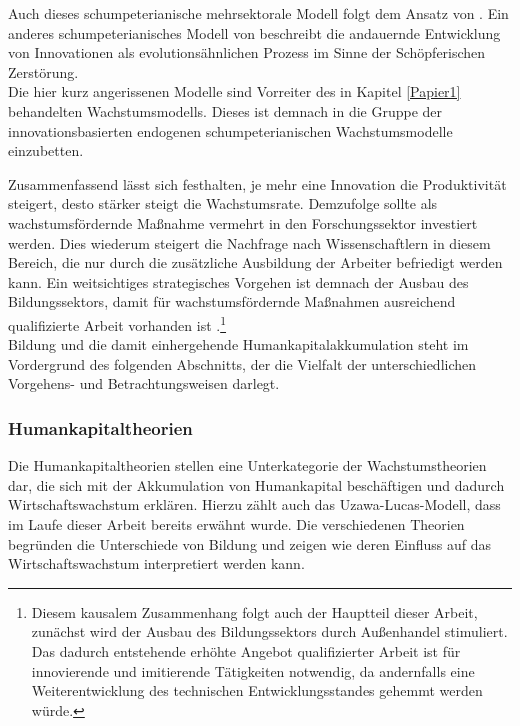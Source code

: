 Auch dieses schumpeterianische mehrsektorale Modell folgt dem Ansatz von \citet{Aghion.1998}. Ein anderes schumpeterianisches Modell von \citet{Reinganum.1985} beschreibt die andauernde Entwicklung von Innovationen als evolutions{\"a}hnlichen Prozess im Sinne der Sch{\"o}pferischen Zerst{\"o}rung.\\
Die hier kurz angerissenen Modelle sind Vorreiter des in Kapitel \ref{Papier1} behandelten Wachstumsmodells. Dieses ist demnach in die Gruppe der innovationsbasierten endogenen schumpeterianischen Wachstumsmodelle einzubetten. 


Zusammenfassend lässt sich festhalten, je mehr eine Innovation die Produktivit{\"a}t steigert, desto st{\"a}rker steigt die Wachstumsrate. Demzufolge sollte als wachstumsf{\"o}rdernde Ma{\ss}nahme vermehrt in den Forschungssektor investiert werden. Dies wiederum steigert die Nachfrage nach Wissenschaftlern in diesem Bereich, die nur durch die zus{\"a}tzliche Ausbildung der Arbeiter befriedigt werden kann. Ein weitsichtiges strategisches Vorgehen ist demnach der Ausbau des Bildungssektors, damit f{\"u}r wachstumsf{\"o}rdernde Ma{\ss}nahmen ausreichend qualifizierte Arbeit vorhanden ist \citep[Kapitel 4]{Aghion.2015}.\footnote{Diesem kausalem Zusammenhang folgt auch der Hauptteil dieser Arbeit, zunächst wird der Ausbau des Bildungssektors durch Au{\ss}enhandel stimuliert. Das dadurch entstehende erhöhte Angebot qualifizierter Arbeit ist für innovierende und imitierende Tätigkeiten notwendig, da andernfalls eine Weiterentwicklung des technischen Entwicklungsstandes gehemmt werden würde.} \\


Bildung und die damit einhergehende Humankapitalakkumulation steht im Vordergrund des folgenden Abschnitts, der die Vielfalt der unterschiedlichen Vorgehens- und Betrachtungsweisen darlegt. 


\subsubsection{Humankapitaltheorien}
Die Humankapitaltheorien stellen eine Unterkategorie der Wachstumstheorien dar, die sich mit der Akkumulation von Humankapital beschäftigen und dadurch Wirtschaftswachstum erklären. Hierzu zählt auch das Uzawa-Lucas-Modell, dass im Laufe dieser Arbeit bereits erwähnt wurde. Die verschiedenen Theorien begründen die Unterschiede von Bildung und zeigen wie deren Einfluss auf das Wirtschaftswachstum interpretiert werden kann.


